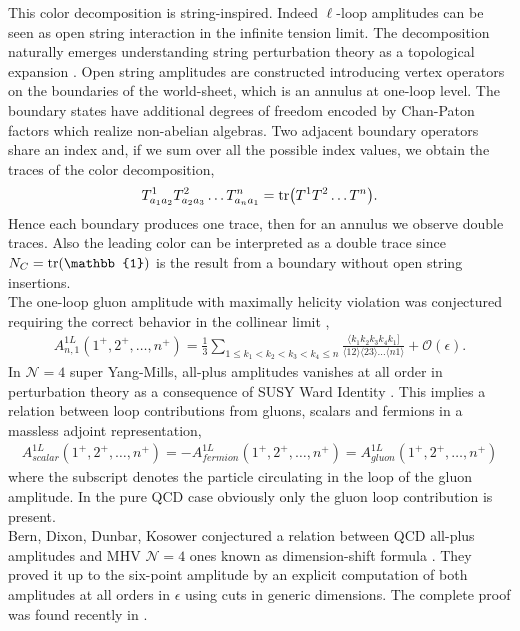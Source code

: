 This color decomposition is string-inspired. Indeed $\ell$-loop amplitudes can be seen as open string interaction in the infinite tension limit. The decomposition naturally emerges understanding string perturbation theory as a topological expansion \cite{Blumenhagen:2013fgp}. Open string amplitudes are constructed introducing vertex operators on the boundaries of the world-sheet, which is an annulus at one-loop level. The boundary states have additional degrees of freedom encoded by Chan-Paton factors which realize non-abelian algebras. Two adjacent boundary operators share an index and, if we sum over all the possible index values, we obtain the traces of the color decomposition,
\begin{align*}
	T^{1}_{a_1a_2} T^2_{a_2a_3} \dots T^n_{a_n a_1}=\tr(T^1T^2\dots T^n).
\end{align*}
Hence each boundary produces one trace, then for an annulus we observe double traces. Also the leading color can be interpreted as a double trace since $N_C=\tr(\mathbb{1})$ is the result from a boundary without open string insertions.\\

The one-loop gluon amplitude with maximally helicity violation was conjectured requiring the correct behavior in the collinear limit \cite{Bern_1994},
\begin{align}
	A^{1L}_{n,1}(1^+,2^+,\dots,n^+)=\frac{1}{3}\sum_{1\leq k_1<k_2<k_3<k_4\leq n}\frac{\langle k_1k_2k_3k_4k_1]}{\langle 12 \rangle \langle 23 \rangle \dots \langle n1 \rangle}+\mathcal{O}(\epsilon).	\label{1LQCD}
\end{align}
In $\mathcal{N}=4$ super Yang-Mills, all-plus amplitudes vanishes at all order in perturbation theory as a consequence of SUSY Ward Identity \cite{2014}. This implies a relation between loop contributions from gluons, scalars and fermions in a massless adjoint representation,
\begin{align}
	A^{1L}_{scalar}(1^+,2^+,\dots,n^+)=-A^{1L}_{fermion}(1^+,2^+,\dots,n^+)=A^{1L}_{gluon}(1^+,2^+,\dots,n^+)
		\label{susyrel}
\end{align}
where the subscript denotes the particle circulating in the loop of the gluon amplitude. In the pure QCD case obviously only the gluon loop contribution is present.\\
Bern, Dixon, Dunbar, Kosower conjectured a relation between QCD all-plus amplitudes and MHV $\mathcal{N}=4$ ones known as dimension-shift formula  \cite{1997}. They proved it up to the six-point amplitude by an explicit computation of both amplitudes at all orders in $\epsilon$ using cuts in generic dimensions. The complete proof was found recently in \cite{Britto:2021tez}.\\

